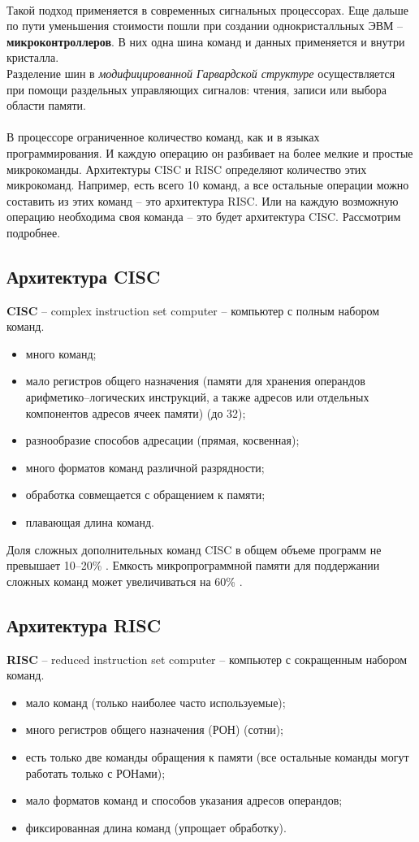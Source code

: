 \\Такой подход применяется в современных сигнальных процессорах. Еще дальше по пути уменьшения стоимости пошли при создании однокристалльных ЭВМ -- \textbf{микроконтроллеров}. В них одна шина команд и данных применяется и внутри кристалла.
\\Разделение шин в \emph{модифицированной Гарвардской структуре} осуществляется при помощи раздельных управляющих сигналов: чтения, записи или выбора области памяти.
\\\\В процессоре ограниченное количество команд, как и в языках программирования. И каждую операцию он разбивает на более мелкие и простые микрокоманды. Архитектуры CISC и RISC определяют количество этих микрокоманд. Например, есть всего 10 команд, а все остальные операции можно составить из этих команд -- это архитектура RISC. Или на каждую возможную операцию необходима своя команда -- это будет архитектура CISC. Рассмотрим подробнее.
\subsection{Архитектура CISC}
\textbf{CISC} -- complex instruction set computer -- компьютер с полным набором команд.
\begin{itemize}
  \item много команд;
  \item мало регистров общего назначения (памяти для хранения операндов арифметико--логических инструкций, а также адресов или отдельных компонентов адресов ячеек памяти) (до 32);
  \item разнообразие способов адресации (прямая, косвенная);
  \item много форматов команд различной разрядности;
  \item обработка совмещается с обращением к памяти;
  \item плавающая длина команд.
\end{itemize}
Доля сложных дополнительных команд CISC в общем объеме программ не превышает 10--20\%
. Емкость микропрограммной памяти для поддержании сложных команд может увеличиваться на 60\%
.
\subsection{Архитектура RISC}
\textbf{RISC} -- reduced instruction set computer -- компьютер с сокращенным набором команд.
\begin{itemize}
  \item мало команд (только наиболее часто используемые);
  \item много регистров общего назначения (РОН) (сотни);
  \item есть только две команды обращения к памяти (все остальные команды могут работать только с РОНами);
  \item мало форматов команд и способов указания адресов операндов;
  \item фиксированная длина команд (упрощает обработку).
\end{itemize}
